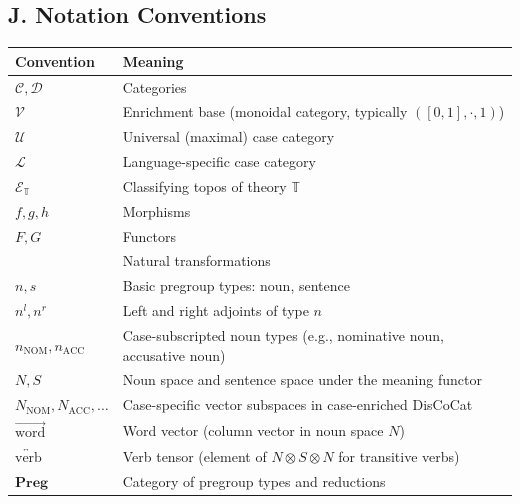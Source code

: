 \documentclass[
]{article}
\newcounter{none} %
\numberwithin{equation}{section}
\begin{document}
\subsection{J. Notation Conventions}\label{j.-notation-conventions}

{\def\LTcaptype{none} %
\begin{longtable}[]{@{}
  >{\raggedright\arraybackslash}p{}
  >{\raggedright\arraybackslash}p{}@{}}
\toprule\noalign{}
\begin{minipage}[b]{\linewidth}\raggedright
Convention
\end{minipage} & \begin{minipage}[b]{\linewidth}\raggedright
Meaning
\end{minipage} \\
\midrule\noalign{}
\endhead
\bottomrule\noalign{}
\endlastfoot
\(\mathcal{C}, \mathcal{D}\) & Categories \\
\(\mathcal{V}\) & Enrichment base (monoidal category, typically
\(([0,1], \cdot, 1)\)) \\
\(\mathcal{U}\) & Universal (maximal) case category \\
\(\mathcal{L}\) & Language-specific case category \\
\(\mathcal{E}_{\mathbb{T}}\) & Classifying topos of theory
\(\mathbb{T}\) \\
\(f, g, h\) & Morphisms \\
\(F, G\) & Functors \\
\(\alpha, \beta) & Natural transformations \\
\(n, s\) & Basic pregroup types: noun, sentence \\
\(n^l, n^r\) & Left and right adjoints of type \(n\) \\
\(n_{\text{NOM}}, n_{\text{ACC}}\) & Case-subscripted noun types (e.g.,
nominative noun, accusative noun) \\
\(N, S\) & Noun space and sentence space under the meaning functor \\
\(N_{\text{NOM}}, N_{\text{ACC}}, \ldots\) & Case-specific vector
subspaces in case-enriched DisCoCat \\
\(\overrightarrow{\text{word}}\) & Word vector (column vector in noun
space \(N\)) \\
\(\overleftrightarrow{\text{verb}}\) & Verb tensor (element of
\(N \otimes S \otimes N\) for transitive verbs) \\
\(\mathbf{Preg}\) & Category of pregroup types and reductions \\

\end{longtable}}
\end{document}
